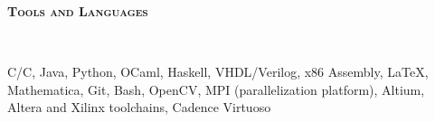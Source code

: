 \documentclass{article}
\newenvironment{changemargin}[2]{%
  \begin{list}{}{%
    \setlength{\topsep}{0pt}%
    \setlength{\leftmargin}{#1}%
    \setlength{\rightmargin}{#2}%
    \setlength{\listparindent}{\parindent}%
    \setlength{\itemindent}{\parindent}%
    \setlength{\parsep}{\parskip}%
  }%
  \item[]}{\end{list}
}
\newcommand{\lineover}{
	\begin{changemargin}{-0.05in}{-0.05in}
		\vspace*{-8pt}
		\hrulefill \\
		\vspace*{-2pt}
	\end{changemargin}
}
\newcommand{\header}[1]{
	\begin{changemargin}{-.5in}{-0.5in}
		{\large \textbf{\scshape{#1}}}\\
  	\lineover
	\end{changemargin}
}
\newenvironment{body} {
	\vspace*{-16pt}
	\begin{changemargin}{-0.25in}{-0.5in}
  }	
	{\end{changemargin}
}
\newcommand{\CC}{C\nolinebreak\hspace{-.05em}\raisebox{.4ex}{\tiny\bf +}\nolinebreak\hspace{-.10em}\raisebox{.4ex}{\tiny\bf +}}
\newcommand{\rr}{\textsubscript{\textregistered}}
\begin{document}
\medskip

\header{Tools and Languages}

\begin{body}
	\vspace{14pt}
	C/\CC, Java, Python, OCaml, Haskell, VHDL/Verilog, x86 Assembly, \LaTeX, Mathematica, Git, Bash, OpenCV, MPI (parallelization platform), Altium, Altera and Xilinx toolchains, Cadence Virtuoso
\end{body}

\end{document}
